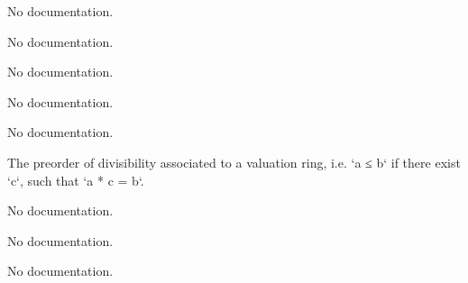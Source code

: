 \begin{definition}\label{lowerIndex}
        \leanok
                No documentation.
    \end{definition}

\begin{definition}\label{RamificationGroup}
                No documentation.
    \end{definition}

\begin{theorem}\label{lower_numbering_inf}
                No documentation.
    \end{theorem}

\begin{theorem}\label{index_subgroup}
                No documentation.
    \end{theorem}

\begin{theorem}\label{index_quotient_group}
                No documentation.
    \end{theorem}

\begin{definition}\label{ValuationRingTopology.ValuationRing.setoid}
                The preorder of divisibility associated to a valuation ring, i.e. `a ≤ b` if there exist `c`, such that `a * c = b`.
    \end{definition}

\begin{definition}\label{ValuationRingTopology.ValuationRing.ValueMonoid}
                No documentation.
    \end{definition}

\begin{definition}\label{ValuationRingTopology.Valuation.leIdeal}
                No documentation.
    \end{definition}

\begin{definition}\label{ValuationRingTopology.Valuation.ltIdeal}
                No documentation.
    \end{definition}

